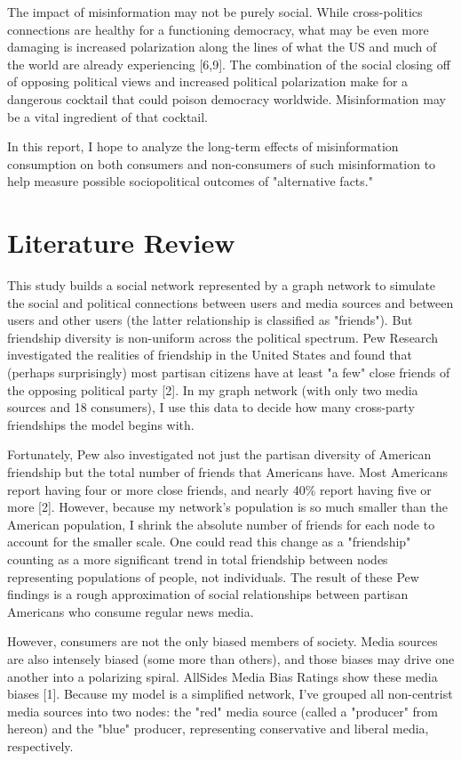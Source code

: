 \documentclass[titlepage, 12pt, leqno]{article}
\begin{document}
The impact of misinformation may not be purely social. While cross-politics connections are healthy for a functioning democracy, what may be even more damaging is increased polarization along the lines of what the US and much of the world are already experiencing [6,9]. The combination of the social closing off of opposing political views and increased political polarization make for a dangerous cocktail that could poison democracy worldwide. Misinformation may be a vital ingredient of that cocktail.

In this report, I hope to analyze the long-term effects of misinformation consumption on both consumers and non-consumers of such misinformation to help measure possible sociopolitical outcomes of "alternative facts."

\pagebreak
\section{Literature Review}
This study builds a social network represented by a graph network to simulate the social and political connections between users and media sources and between users and other users (the latter relationship is classified as "friends"). But friendship diversity is non-uniform across the political spectrum. Pew Research investigated the realities of friendship in the United States and found that (perhaps surprisingly) most partisan citizens have at least "a few" close friends of the opposing political party [2]. In my graph network (with only two media sources and 18 consumers), I use this data to decide how many cross-party friendships the model begins with.

Fortunately, Pew also investigated not just the partisan diversity of American friendship but the total number of friends that Americans have. Most Americans report having four or more close friends, and nearly 40\% report having five or more [2]. However, because my network's population is so much smaller than the American population, I shrink the absolute number of friends for each node to account for the smaller scale. One could read this change as a "friendship" counting as a more significant trend in total friendship between nodes representing populations of people, not individuals. The result of these Pew findings is a rough approximation of social relationships between partisan Americans who consume regular news media.

However, consumers are not the only biased members of society. Media sources are also intensely biased (some more than others), and those biases may drive one another into a polarizing spiral. AllSides Media Bias Ratings show these media biases [1]. Because my model is a simplified network, I've grouped all non-centrist media sources into two nodes: the "red" media source (called a "producer" from hereon) and the "blue" producer, representing conservative and liberal media, respectively. 
\end{document}
